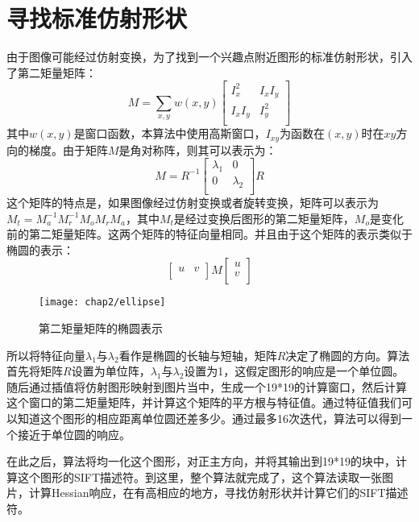   \section{寻找标准仿射形状}
    由于图像可能经过仿射变换，为了找到一个兴趣点附近图形的标准仿射形状，引入了第二矩量矩阵：
    \begin{equation*}
      M=\sum_{x,y}w(x,y)\left[\begin{array}{cc}
      I_x^2 & I_xI_y \\
      I_xI_y & I_y^2 \\
      \end{array}\right]
    \end{equation*}
    其中$w(x,y)$是窗口函数，本算法中使用高斯窗口，$I_{xy}$为函数在$(x,y)$时在$xy$方向的梯度。由于矩阵$M$是角对称阵，则其可以表示为：
    \begin{equation}
      M=R^{-1}\left[\begin{array}{cc}
      \lambda_1 & 0 \\
      0 & \lambda_2 \\
      \end{array}\right]R
    \end{equation}
    这个矩阵的特点是，如果图像经过仿射变换或者旋转变换，矩阵可以表示为$M_t=M_a^{-1}M_r^{-1}M_oM_rM_a$，其中$M_t$是经过变换后图形的第二矩量矩阵，$M_o$是变化前的第二矩量矩阵。这两个矩阵的特征向量相同。并且由于这个矩阵的表示类似于椭圆的表示：
    \begin{equation*}
    \left[\begin{array}{cc}
    u & v \\
    \end{array}\right]M
    \left[\begin{array}{c}
    u \\
    v \\
    \end{array}\right]
    \end{equation*}
    \begin{wrapfigure}{r}{0.45\textwidth}
      \centering
      \texttt{[image: chap2/ellipse]}
      \caption{第二矩量矩阵的椭圆表示}
    \end{wrapfigure}
    所以将特征向量$\lambda_1$与$\lambda_2$看作是椭圆的长轴与短轴，矩阵$R$决定了椭圆的方向。算法首先将矩阵$R$设置为单位阵，$\lambda_1$与$\lambda_2$设置为1，这假定图形的响应是一个单位圆。随后通过插值将仿射图形映射到图片当中，生成一个19*19的计算窗口，然后计算这个窗口的第二矩量矩阵，并计算这个矩阵的平方根与特征值。通过特征值我们可以知道这个图形的相应距离单位圆还差多少。通过最多16次迭代，算法可以得到一个接近于单位圆的响应。
    \par
    在此之后，算法将均一化这个图形，对正主方向，并将其输出到19*19的块中，计算这个图形的SIFT描述符。到这里，整个算法就完成了，这个算法读取一张图片，计算Hessian响应，在有高相应的地方，寻找仿射形状并计算它们的SIFT描述符。


